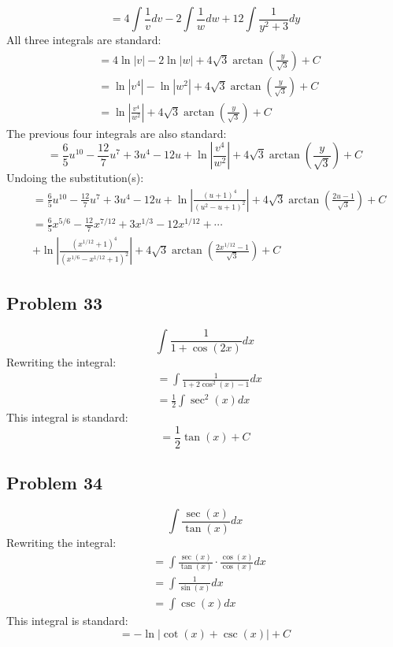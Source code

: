 \documentclass{article}
\begin{document}
$$=4\int\frac{1}{v}dv-2\int\frac{1}{w}dw+12\int\frac{1}{y^2+3}dy$$
All three integrals are standard:
\begin{align*}
&=4\ln|v|-2\ln|w|+4\sqrt{3}\arctan\left(\frac{y}{\sqrt{3}}\right)+C \\
&=\ln\left|v^4\right|-\ln\left|w^2\right|+4\sqrt{3}\arctan\left(\frac{y}{\sqrt{3}}\right)+C \\
&=\ln\left|\frac{v^4}{w^2}\right|+4\sqrt{3}\arctan\left(\frac{y}{\sqrt{3}}\right)+C
\end{align*}
The previous four integrals are also standard:
$$=\frac{6}{5}u^{10}-\frac{12}{7}u^7+3u^4-12u+\ln\left|\frac{v^4}{w^2}\right|+4\sqrt{3}\arctan\left(\frac{y}{\sqrt{3}}\right)+C$$
Undoing the substitution(s):
\begin{align*}
&=\frac{6}{5}u^{10}-\frac{12}{7}u^7+3u^4-12u+\ln\left|\frac{(u+1)^4}{(u^2-u+1)^2}\right|+4\sqrt{3}\arctan\left(\frac{2u-1}{\sqrt{3}}\right)+C \\
&=\frac{6}{5}x^{5/6}-\frac{12}{7}x^{7/12}+3x^{1/3}-12x^{1/12}+\cdots \\
&+\ln\left|\frac{(x^{1/12}+1)^4}{(x^{1/6}-x^{1/12}+1)^2}\right|+4\sqrt{3}\arctan\left(\frac{2x^{1/12}-1}{\sqrt{3}}\right)+C
\end{align*}
\subsection*{Problem 33}
$$\int\frac{1}{1+\cos\left(2x\right)}dx$$
Rewriting the integral:
\begin{align*}
&=\int\frac{1}{1+2\cos^2(x)-1}dx \\
&=\frac{1}{2}\int\sec^2(x)dx
\end{align*}
This integral is standard:
$$=\frac{1}{2}\tan(x)+C$$
\subsection*{Problem 34}
$$\int\frac{\sec\left(x\right)}{\tan\left(x\right)}dx$$
Rewriting the integral:
\begin{align*}
&=\int\frac{\sec(x)}{\tan(x)}\cdot\frac{\cos(x)}{\cos(x)}dx \\
&=\int\frac{1}{\sin(x)}dx \\
&=\int\csc(x)dx
\end{align*}
This integral is standard:
$$=-\ln\left|\cot(x)+\csc(x)\right|+C$$
\end{document}
